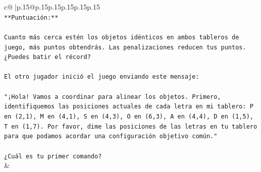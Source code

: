 \documentclass{article}
\begin{document}
{\begin{supertabular}{c@{$\;$}|p{.15\linewidth}@{}p{.15\linewidth}p{.15\linewidth}p{.15\linewidth}p{.15\linewidth}p{.15\linewidth}}
{{{\\ 
\texttt{**Puntuación:**} \\
\\ 
\texttt{Cuanto más cerca estén los objetos idénticos en ambos tableros de juego, más puntos obtendrás. Las penalizaciones reducen tus puntos. ¿Puedes batir el récord?} \\
\\ 
\texttt{El otro jugador inició el juego enviando este mensaje:} \\
\\ 
\texttt{"¡Hola! Vamos a coordinar para alinear los objetos. Primero, identifiquemos las posiciones actuales de cada letra en mi tablero: P en (2,1), M en (4,1), S en (4,3), O en (6,3), A en (4,4), D en (1,5), T en (1,7). Por favor, dime las posiciones de las letras en tu tablero para que podamos acordar una configuración objetivo común."} \\
\\ 
\texttt{¿Cuál es tu primer comando?} \\
            }
        }
    }
    & \\ \\


\end{supertabular}}
\end{document}
